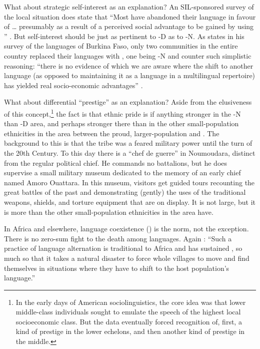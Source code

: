 \documentclass[output=paper,
modfonts
]{langscibook}
\begin{document}
What about strategic self-interest as an explanation? An SIL-sponsored survey of the local situation does state that “Most  have abandoned their language in favour of  … presumably as a result of a perceived social advantage to be gained by using ” \citep[5]{BertheletteBerthelette2001}. But self-interest should be just as pertinent to -D as to -N. As \citet{Showalter2008} states in his survey of the languages of Burkina Faso, only two communities in the entire country replaced their languages with , one being -N and \citeauthor{LüpkeStorch2013} counter such simplistic reasoning: “there is no evidence of which we are aware where the shift to another language (as opposed to maintaining it as a language in a multilingual repertoire) has yielded real socio-economic advantages” \citep[286]{LüpkeStorch2013}.

\newpage
What about differential ``prestige'' as an explanation? Aside from the elusiveness of this concept,\footnote{In the early days of American sociolinguistics, the core idea was that lower middle-class individuals sought to emulate the speech of the highest local socioeconomic class. But the data eventually forced recognition of, first, a kind of prestige in the lower echelons, and then another kind of prestige in the middle.} the fact is that  ethnic pride is if anything stronger in the -N than -D area, and perhaps stronger there than in the other small-population ethnicities in the area between the proud, larger-population  and . The background to this is that the  tribe was a feared military power until the turn of the 20th Century. To this day there is a  “chef de guerre” in Noumoudara, distinct from the regular political chief. He commands no battalions, but he does supervise a small military museum dedicated to the memory of an early chief named Amoro Ouattara. In this museum, visitors get guided tours recounting the great battles of the past and demonstrating (gently) the uses of the traditional weapons, shields, and torture equipment that are on display. It is not large, but it is more than the other small-population ethnicities in the area have.

In Africa and elsewhere, language coexistence () is the norm, not the exception. There is no zero-sum fight to the death among languages. Again \citep[76]{Mufwene2009}: “Such a practice of language alternation is traditional to Africa and has sustained , so much so that it takes a natural disaster to force whole villages to move and find themselves in situations where they have to shift to the host population’s language.”
\end{document}

